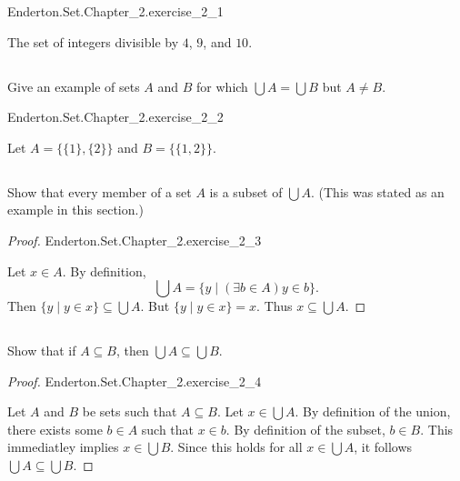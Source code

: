 \documentclass{report}
\begin{document}
\begin{answer}

    {Enderton.Set.Chapter\_2.exercise\_2\_1}

  The set of integers divisible by $4$, $9$, and $10$.

\end{answer}

\subsection{}%
\label{sub:exercise-2.2}

Give an example of sets $A$ and $B$ for which $\bigcup A = \bigcup B$ but
  $A \neq B$.

\begin{answer}

    {Enderton.Set.Chapter\_2.exercise\_2\_2}

  Let $A = \{\{1\}, \{2\}\}$ and $B = \{\{1, 2\}\}$.

\end{answer}

\subsection{}%
\label{sub:exercise-2.3}

Show that every member of a set $A$ is a subset of $\bigcup A$.
(This was stated as an example in this section.)

\begin{proof}

    {Enderton.Set.Chapter\_2.exercise\_2\_3}

  Let $x \in A$.
  By definition, $$\bigcup A = \{ y \mid (\exists b \in A) y \in b\}.$$
  Then $\{ y \mid y \in x\} \subseteq \bigcup A$.
  But $\{ y \mid y \in x\} = x$.
  Thus $x \subseteq \bigcup A$.

\end{proof}

\subsection{}%
\label{sub:exercise-2.4}

Show that if $A \subseteq B$, then $\bigcup A \subseteq \bigcup B$.

\begin{proof}

    {Enderton.Set.Chapter\_2.exercise\_2\_4}

  Let $A$ and $B$ be sets such that $A \subseteq B$.
  Let $x \in \bigcup A$.
  By definition of the union, there exists some $b \in A$ such that $x \in b$.
  By definition of the subset, $b \in B$.
  This immediatley implies $x \in \bigcup B$.
  Since this holds for all $x \in \bigcup A$, it follows
    $\bigcup A \subseteq \bigcup B$.

\end{proof}
\end{document}
